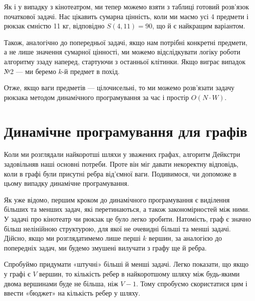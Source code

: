 \documentclass[12pt,a4paper]{report}
\begin{document}
\begin{center}
\end{center}

Як і у випадку з кінотеатром, ми тепер можемо взяти з таблиці готовий розв’язок початкової задачі. Нас цікавить сумарна цінність, коли ми маємо усі 4 предмети і рюкзак ємністю 11 кг, відповідно \(S(4, 11) = 90\), що й є найкращим варіантом.

Також, аналогічно до попередньої задачі, якщо нам потрібні конкретні предмети, а не лише значення сумарної цінності, ми можемо відслідкувати логіку роботи алгоритму ззаду наперед, стартуючи з останньої клітинки. Якщо виграє випадок №2 --- ми беремо \(k\)-й предмет в похід.

Отже, якщо ваги предметів --- цілочисельні, то ми можемо розв’язати задачу рюкзака методом динамічного програмування за час і простір \(O(N \cdot W)\).



\section{Динамічне програмування для графів}

Коли ми розглядали найкоротші шляхи у зважених графах, алгоритм Дейкстри задовільняв наші основні потреби. Проте він міг давати некоректну відповідь, коли в графі були присутні ребра від’ємної ваги. Подивимося, чи допоможе в цьому випадку динамічне програмування.

Як уже відомо, першим кроком до динамічного програмування є виділення більших та менших задач, які перетинаються, а також закономірностей між ними. У задачі про кінотеатр чи рюкзак це було легко зробити. Натомість, граф є значно більш нелінійною структурою, для якої не очевидні більші та менші задачі. Дійсно, якщо ми розглядатимемо лише перші \(k\) вершин, за аналогією до попередніх задач, ми будемо змушені вилучати з графу ще й ребра.

Спробуймо придумати «штучні» більші й менші задачі. Легко показати, що якщо у графі є \(V\) вершин, то кількість ребер в найкоротшому шляху між будь-якими двома вершинами буде не більша, ніж \(V - 1\). Тому спробуємо скористатися цим і ввести «бюджет» на кількість ребер у шляху.
\end{document}
